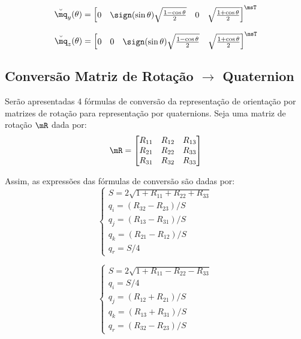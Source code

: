 \documentclass[]{politex}
\begin{document}
\begin{equation}
\breve{\mq}_y (\theta) = \begin{bmatrix}
0 & \sign(\sin\theta) \sqrt{\frac{1-\cos\theta}{2}} & 0 & \sqrt{\frac{1+\cos\theta}{2}}
\end{bmatrix}^\msT
\end{equation}

\begin{equation}
\breve{\mq}_z (\theta) = \begin{bmatrix}
0 & 0 & \sign(\sin\theta) \sqrt{\frac{1-\cos\theta}{2}} & \sqrt{\frac{1+\cos\theta}{2}}
\end{bmatrix}^\msT
\end{equation}

\subsection{Conversão Matriz de Rotação $\rightarrow$ Quaternion}

Serão apresentadas 4 fórmulas de conversão da representação de orientação por matrizes de rotação para representação por quaternions. Seja uma matriz de rotação $\mR$ dada por:
\begin{equation}
\mR = \begin{bmatrix}
R_{11} & R_{12} & R_{13} \\
R_{21} & R_{22} & R_{33} \\
R_{31} & R_{32} & R_{33} \\
\end{bmatrix}
\end{equation}

Assim, as expressões das fórmulas de conversão são dadas por:
\begin{equation}
\begin{cases} \label{eq:Matriz2Quat0}
S = 2 \sqrt{1 + R_{11} + R_{22} + R_{33}} \\
q_i = (R_{32} - R_{23})/S \\
q_j = (R_{13} - R_{31})/S \\
q_k = (R_{21} - R_{12})/S \\
q_r = S/4
\end{cases}
\end{equation}

\begin{equation}
\begin{cases} \label{eq:Matriz2Quat1}
S = 2 \sqrt{1 + R_{11} - R_{22} - R_{33}} \\
q_i = S/4 \\
q_j = (R_{12} + R_{21})/S \\
q_k = (R_{13} + R_{31})/S \\
q_r = (R_{32} - R_{23})/S
\end{cases}
\end{equation}
\end{document}
